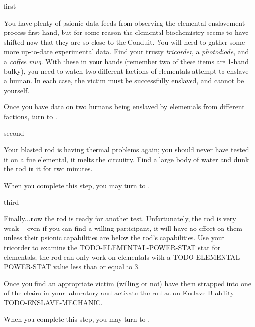 \documentclass[notebook]{elementals}
\begin{document}

\startnotebook{\nEnslavementResearch{}}

\begin{page}{first}

You have plenty of psionic data feeds from observing the elemental enslavement process first-hand, but for some reason the elemental biochemistry seems to have shifted now that they are so close to the Conduit. You will need to gather some more up-to-date experimental data. Find your trusty \emph{tricorder}, a \emph{photodiode}, and a \emph{coffee mug}. With these in your hands (remember two of these items are 1-hand bulky), you need to watch two different factions of elementals attempt to enslave a human. In each case, the victim must be successfully enslaved, and cannot be yourself.

Once you have data on two humans being enslaved by elementals from different factions, turn to .

\end{page}

\begin{page}{second}

Your blasted rod is having thermal problems again; you should never have tested it on a fire elemental, it melts the circuitry. Find a large body of water and dunk the rod in it for two minutes.

When you complete this step, you may turn to .

\end{page}

\begin{page}{third}

Finally...now the rod is ready for another test. Unfortunately, the rod is very weak -- even if you can find a willing participant, it will have no effect on them unless their psionic capabilities are below the rod's capabilities. Use your tricorder to examine the TODO-ELEMENTAL-POWER-STAT stat for elementals; the rod can only work on elementals with a TODO-ELEMENTAL-POWER-STAT value less than or equal to 3.

Once you find an appropriate victim (willing or not) have them strapped into one of the chairs in your laboratory and activate the rod as an Enslave B ability TODO-ENSLAVE-MECHANIC.

When you complete this step, you may turn to .

\end{page}
\end{document}
